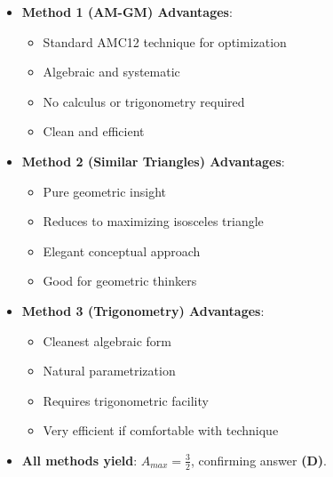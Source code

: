 \documentclass[12pt]{article}
\begin{document}
\begin{solutionbox}
\begin{itemize}[leftmargin=*]
    \item \textbf{Method 1 (AM-GM) Advantages}: 
    \begin{itemize}
        \item Standard AMC12 technique for optimization
        \item Algebraic and systematic
        \item No calculus or trigonometry required
        \item Clean and efficient
    \end{itemize}
    \item \textbf{Method 2 (Similar Triangles) Advantages}:
    \begin{itemize}
        \item Pure geometric insight
        \item Reduces to maximizing isosceles triangle
        \item Elegant conceptual approach
        \item Good for geometric thinkers
    \end{itemize}
    \item \textbf{Method 3 (Trigonometry) Advantages}:
    \begin{itemize}
        \item Cleanest algebraic form
        \item Natural parametrization
        \item Requires trigonometric facility
        \item Very efficient if comfortable with technique
    \end{itemize}
    \item \textbf{All methods yield}: $A_{max} = \frac{3}{2}$, confirming answer \textbf{(D)}.
\end{itemize}
\end{solutionbox}
\end{document}
